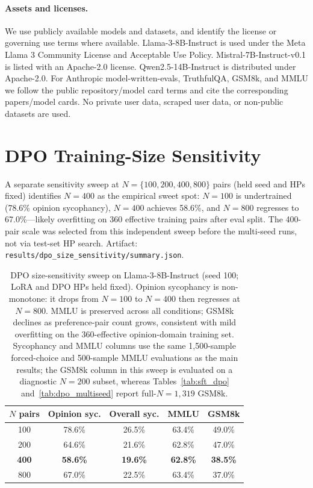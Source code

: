 \documentclass{article}
\begin{document}
\paragraph{Assets and licenses.}
We use publicly available models and datasets, and identify the license or governing use terms where available. Llama-3-8B-Instruct is used under the Meta Llama 3 Community License and Acceptable Use Policy. Mistral-7B-Instruct-v0.1 is listed with an Apache-2.0 license. Qwen2.5-14B-Instruct is distributed under Apache-2.0. For Anthropic model-written-evals, TruthfulQA, GSM8k, and MMLU we follow the public repository/model card terms and cite the corresponding papers/model cards. No private user data, scraped user data, or non-public datasets are used.

\FloatBarrier
\section{DPO Training-Size Sensitivity}
\label{app:size_sensitivity}

A separate sensitivity sweep at $N{=}\{100, 200, 400, 800\}$ pairs (held seed and HPs fixed) identifies $N{=}400$ as the empirical sweet spot: $N{=}100$ is undertrained (78.6\% opinion sycophancy), $N{=}400$ achieves 58.6\%, and $N{=}800$ regresses to 67.0\%---likely overfitting on 360 effective training pairs after eval split. The 400-pair scale was selected from this independent sweep before the multi-seed runs, not via test-set HP search. Artifact: \texttt{results/dpo\_size\_sensitivity/summary.json}.

\begin{table}[h]
\centering
\small
\caption{DPO size-sensitivity sweep on Llama-3-8B-Instruct (seed 100; LoRA and DPO HPs held fixed). Opinion sycophancy is non-monotone: it drops from $N{=}100$ to $N{=}400$ then regresses at $N{=}800$. MMLU is preserved across all conditions; GSM8k declines as preference-pair count grows, consistent with mild overfitting on the 360-effective opinion-domain training set. Sycophancy and MMLU columns use the same 1{,}500-sample forced-choice and 500-sample MMLU evaluations as the main results; the GSM8k column in this sweep is evaluated on a diagnostic $N{=}200$ subset, whereas Tables~\ref{tab:sft_dpo} and~\ref{tab:dpo_multiseed} report full-$N{=}1{,}319$ GSM8k.}
\label{tab:size_sensitivity}
\begin{tabular}{@{}ccccc@{}}
\toprule
\textbf{$N$ pairs} & \textbf{Opinion syc.} & \textbf{Overall syc.} & \textbf{MMLU} & \textbf{GSM8k} \\
\midrule
100 & 78.6\% & 26.5\% & 63.4\% & 49.0\% \\
200 & 64.6\% & 21.6\% & 62.8\% & 47.0\% \\
\textbf{400} & \textbf{58.6\%} & \textbf{19.6\%} & \textbf{62.8\%} & \textbf{38.5\%} \\
800 & 67.0\% & 22.5\% & 63.4\% & 37.0\% \\
\bottomrule
\end{tabular}
\end{table}

\clearpage

\end{document}
